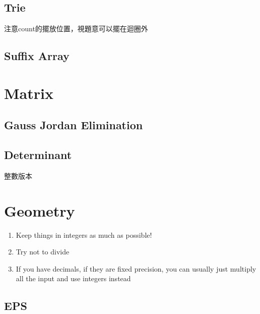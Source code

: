 \documentclass[10pt,oneside]{article}
\begin{document}
\begin{landscape}
\begin{multicols}{2}

\subsection{Trie}
{\normalsize 
注意count的擺放位置，視題意可以擺在迴圈外
}

\subsection{Suffix Array}

\section{Matrix}

\subsection{Gauss Jordan Elimination}

\subsection{Determinant}

{\normalsize 
整數版本
}



\section{Geometry}

{\normalsize 
\begin{enumerate}
	\item Keep things in integers as much as possible!
	\item Try not to divide
	\item If you have decimals, if they are fixed precision, you can usually just multiply all the input and use integers instead
\end{enumerate}
}

\subsection{EPS}

{\normalsize 

}
\end{multicols}
\end{landscape}
\end{document}
